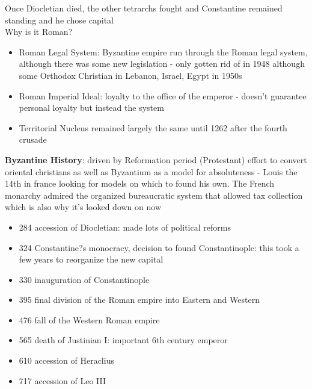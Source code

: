 \documentclass{article}
\begin{document}
Once Diocletian died, the other tetrarchs fought and Constantine remained standing and he chose capital \\
Why is it Roman?
\begin{itemize}
\item Roman Legal System: Byzantine empire run through the Roman legal system, although there was some new legislation - only gotten rid of in 1948 although some Orthodox Christian in Lebanon, Israel, Egypt in 1950s
\item Roman Imperial Ideal: loyalty to the office of the emperor - doesn't guarantee personal loyalty but instead the system
\item Territorial Nucleus remained largely the same until 1262 after the fourth crusade
\end{itemize}
\textbf{Byzantine History}: driven by Reformation period (Protestant) effort to convert oriental christians as well as Byzantium as a model for absoluteness - Louis the 14th in france looking for models on which to found his own. The French monarchy admired the organized bureaucratic system that allowed tax collection which is also why it's looked down on now \\ 
\begin{itemize}
\item 284 accession of Diocletian: made lots of political reforms
\item	324 Constantine?s monocracy, decision to found Constantinople: this took a few years to reorganize the new capital
\item	330 inauguration of Constantinople
\item	395 final division of the Roman empire into Eastern and Western
\item	476 fall of the Western Roman empire
\item	565 death of Justinian I: important 6th century emperor
\item	610 accession of Heraclius
\item	717 accession of Leo III
\end{itemize}
\end{document}

